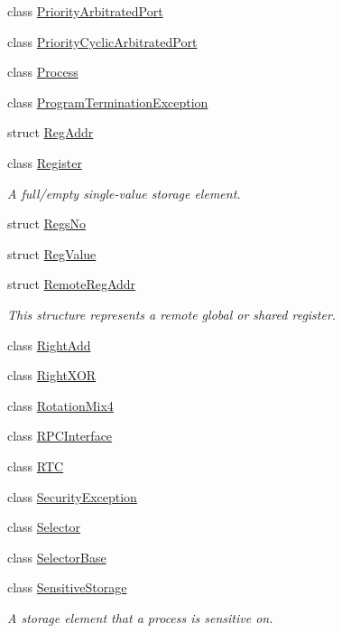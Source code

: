\begin{DoxyCompactItemize}
class \hyperlink{class_simulator_1_1_priority_arbitrated_port}{Priority\+Arbitrated\+Port}
\item 
class \hyperlink{class_simulator_1_1_priority_cyclic_arbitrated_port}{Priority\+Cyclic\+Arbitrated\+Port}
\item 
class \hyperlink{class_simulator_1_1_process}{Process}
\item 
class \hyperlink{class_simulator_1_1_program_termination_exception}{Program\+Termination\+Exception}
\item 
struct \hyperlink{struct_simulator_1_1_reg_addr}{Reg\+Addr}
\item 
class \hyperlink{class_simulator_1_1_register}{Register}
\begin{DoxyCompactList}\small\item\em A full/empty single-\/value storage element. \end{DoxyCompactList}\item 
struct \hyperlink{struct_simulator_1_1_regs_no}{Regs\+No}
\item 
struct \hyperlink{struct_simulator_1_1_reg_value}{Reg\+Value}
\item 
struct \hyperlink{struct_simulator_1_1_remote_reg_addr}{Remote\+Reg\+Addr}
\begin{DoxyCompactList}\small\item\em This structure represents a remote global or shared register. \end{DoxyCompactList}\item 
class \hyperlink{class_simulator_1_1_right_add}{Right\+Add}
\item 
class \hyperlink{class_simulator_1_1_right_x_o_r}{Right\+X\+O\+R}
\item 
class \hyperlink{class_simulator_1_1_rotation_mix4}{Rotation\+Mix4}
\item 
class \hyperlink{class_simulator_1_1_r_p_c_interface}{R\+P\+C\+Interface}
\item 
class \hyperlink{class_simulator_1_1_r_t_c}{R\+T\+C}
\item 
class \hyperlink{class_simulator_1_1_security_exception}{Security\+Exception}
\item 
class \hyperlink{class_simulator_1_1_selector}{Selector}
\item 
class \hyperlink{class_simulator_1_1_selector_base}{Selector\+Base}
\item 
class \hyperlink{class_simulator_1_1_sensitive_storage}{Sensitive\+Storage}
\begin{DoxyCompactList}\small\item\em A storage element that a process is sensitive on. \end{DoxyCompactList}\item 

\end{DoxyCompactItemize}
